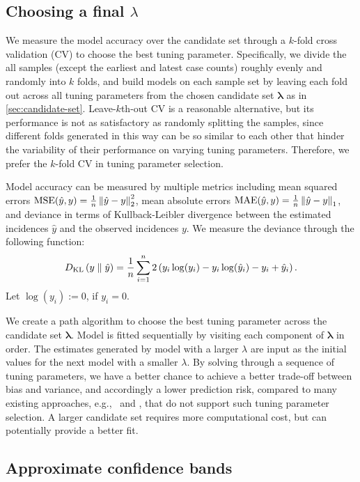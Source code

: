\subsection{Choosing a final $\lambda$}
\label{sec:cv}

We measure the model accuracy over the candidate set through a $k$-fold 
cross validation (CV) to choose the best tuning parameter. 
Specifically, we divide the all samples (except the earliest and latest case counts) 
roughly evenly and randomly into $k$ folds, and build models on each sample set 
by leaving each fold out across all tuning parameters from the chosen 
candidate set $\boldsymbol{\lambda}$ as in \autoref{sec:candidate-set}. 
% 
Leave-$k$th-out CV is a reasonable alternative, but its performance is 
not as satisfactory as randomly splitting the samples, since 
different folds generated in this way can be so similar to each other that hinder 
the variability of their performance on varying tuning parameters. Therefore, 
we prefer the $k$-fold CV in tuning parameter selection. 

Model accuracy can be measured by multiple metrics including mean squared errors 
$\mathrm{MSE}(\hat{y}, y) = \frac{1}{n}\left\lVert \hat{y} - y \right\rVert_2^2$, mean absolute errors 
$\mathrm{MAE}(\hat{y}, y) = \frac{1}{n}\left\lVert \hat{y} - y \right\rVert_1$, and 
deviance in terms of Kullback-Leibler divergence between the estimated 
incidences $\hat{y}$ and the observed incidences $y$. 
We measure the deviance through the following function: 
$$D_{\mathrm{KL}} \left(y \parallel \hat{y}\right) = \frac{1}{n} \sum_{i=1}^n 2\left(y_i \log(y_i) - y_i\log(\hat{y}_i) - y_i + \hat{y}_i\right).$$ 
Let $\log(y_i) := 0$, if $y_i=0$. 

We create a path algorithm to choose the best tuning parameter across the candidate 
set $\boldsymbol{\lambda}$. Model is fitted sequentially by visiting each component 
of $\boldsymbol{\lambda}$ in order. The estimates generated by model with a larger 
$\lambda$ are input as the initial values for the next model with a smaller $\lambda$. 
By solving through a sequence of tuning parameters, we have a better chance to 
achieve a better trade-off between bias and variance, and accordingly a lower prediction risk, 
compared to many existing approaches, e.g., \EpiEstim\ and \EpiLPS, that do not support 
such tuning parameter selection. 
A larger candidate set requires more computational cost, but can potentially 
provide a better fit. 


\subsection{Approximate confidence bands} 
\label{sec:conf-band} 


